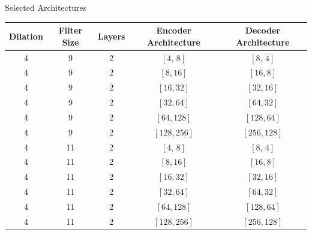 \documentclass[8pt,xcolor=dvipsnames,compress]{beamer}
\begin{document}
\begin{frame}{Selected Architectures}
\footnotesize
\begin{table}[h!]
    \centering
    \renewcommand{\arraystretch}{1.4}
    \begin{tabular}{|c|c|c|c|c|}
    \hline
    \textbf{Dilation} & \textbf{Filter Size} & \textbf{Layers} & \textbf{Encoder Architecture} & \textbf{Decoder Architecture} \\
    \hline
        4 & 9 & 2 & $[4,\,8]$ & $[8,\,4]$ \\
        4 & 9 & 2 & $[8,16]$ & $[16,8]$ \\
        4 & 9 & 2 & $[16,32]$ & $[32,16]$ \\
        4 & 9 & 2 & $[32,64]$ & $[64,32]$ \\
        4 & 9 & 2 & $[64,128]$ & $[128,64]$ \\
        4 & 9 & 2 & $[128,256]$ & $[256,128]$ \\
        \hline
        4 & 11 & 2 & $[4,\,8]$ & $[8,\,4]$ \\
        4 & 11 & 2 & $[8,16]$ & $[16,8]$ \\
        4 & 11 & 2 & $[16,32]$ & $[32,16]$ \\
        4 & 11 & 2 & $[32,64]$ & $[64,32]$ \\
        4 & 11 & 2 & $[64,128]$ & $[128,64]$ \\
        4 & 11 & 2 & $[128,256]$ & $[256,128]$ \\
        \hline
     \end{tabular}
    \label{tab:tcn_architectures}
\end{table}
\end{frame}
% 
\end{document}
